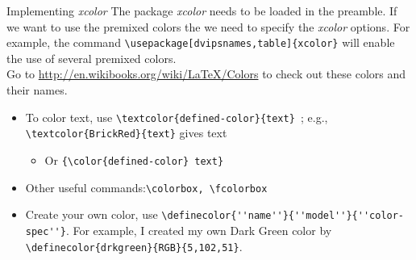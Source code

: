 \documentclass{beamer}\usepackage[]{graphicx}\usepackage[]{color}
\begin{document}
\begin{frame}[fragile]{Implementing \emph{\textrm{xcolor}}}
\textrm{The package \emph{\textrm{xcolor}} needs to be loaded in the preamble. If we want to use the premixed colors the we need to specify the \emph{\textrm{xcolor}} options. For example, the command}  \verb=\usepackage[dvipsnames,table]{xcolor}= \textrm{will enable the use of several premixed colors. \\
\pause
Go to \url{http://en.wikibooks.org/wiki/LaTeX/Colors} to check out these colors and their names.}
\pause
\begin{itemize}
  \item To color text, use \verb=\textcolor{defined-color}{text} =; e.g., \verb=\textcolor{BrickRed}{text}= gives \textcolor{BrickRed}{text}
    \begin{itemize}
       \pause \item Or \verb={\color{defined-color} text} =
   \end{itemize}
    \pause\item Other useful commands:\verb=\colorbox, \fcolorbox =
    \pause\item Create your own color, use \verb=\definecolor{''name''}{''model''}{''color-spec''}=. For example, I created my own Dark Green color by \verb=\definecolor{drkgreen}{RGB}{5,102,51}=.
\end{itemize}
\end{frame}
\end{document}

